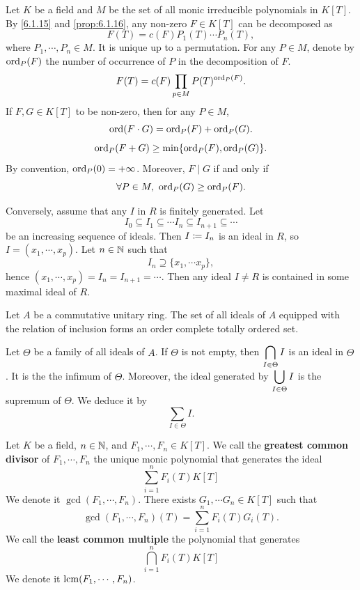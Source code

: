 \begin{remark}
    Let $K$ be a field and $M$ be the set of all monic irreducible polynomials in $K[T]$.
    By \ref{6.1.15} and \ref{prop:6.1.16},
    any non-zero $F \in K[T]$ can be decomposed as 
    $$F(T) = c(F) P_1(T) \cdots P_n(T),$$
    where $P_1,\cdots, P_n \in M$.
    It is unique up to a permutation.
    For any $P \in M$, denote by $\operatorname{\mathrm{ord}}_P(F)$ the number of occurrence of $P$ in the decomposition of $F$.
    $$F(T) = c(F) \prod_{p \in M} P(T)^{\operatorname{\mathrm{ord}}_P(F)}.$$
    If $F,G \in K[T]$ to be non-zero,
    then for any $P \in M$,
    $$\operatorname{\mathrm{ord}}(F \cdot G) = \operatorname{\mathrm{ord}}_P(F) + \operatorname{\mathrm{ord}}_P(G).$$
    $$\operatorname{\mathrm{ord}}_P(F + G) \ge \min\{\operatorname{\mathrm{ord}}_P(F), \operatorname{\mathrm{ord}}_P(G)\}.$$
    By convention, $\operatorname{\mathrm{ord}}_P(0) = +\infty$.
    Moreover, $F \mid G$ if and only if
    $$\forall P \in M,\ \operatorname{\mathrm{ord}}_P(G) \ge \operatorname{\mathrm{ord}}_P(F).$$
    
    \quad Conversely, assume that any $I$ in $R$ is finitely generated.
    Let
    $$I_0 \subseteq I_1 \subseteq \cdots I_n \subseteq I_{n+1} \subseteq \cdots$$
    be an increasing sequence of ideals.
    Then $\displaystyle I \coloneq I_n$ is an ideal in $R$, so $I = (x_1,\cdots,x_p)$.
    Let $n \in \mathbb{N}$ such that 
    $$I_n \supseteq \{x_1,\cdots x_p\},$$
    hence $(x_1,\cdots,x_p) = I_n = I_{n+1} = \cdots$.
    Then any ideal $I \neq R$ is contained in some maximal ideal of $R$.
\end{remark}

\begin{propositionenv}
    Let $A$ be a commutative unitary ring.
    The set of all ideals of $A$ equipped with the relation of inclusion forms an order complete totally ordered set.
\end{propositionenv}
\begin{proofenv}
    Let $\Theta$ be a family of all ideals of $A$.
    If $\Theta$ is not empty, then $\displaystyle \bigcap_{I \in \Theta} I$ is an ideal in $\Theta$.
    It is the the infimum of $\Theta$.
    Moreover, the ideal generated by $\displaystyle \bigcup_{I \in \Theta } I$ is the supremum of $\Theta$.
    We deduce it by
    $$\sum_{I \in \Theta} I.$$
\end{proofenv}

\begin{definitionenv}
    Let $K$ be a field, $n \in \mathbb{N}$, and $F_1,\cdots, F_n \in K[T]$.
    We call the \textbf{greatest common divisor} of $F_1,\cdots, F_n$ the unique monic polynomial that generates the ideal
    $$\sum_{i=1}^n F_i(T)K[T]$$
    We denote it $\gcd(F_1,\cdots, F_n)$.
    There exists $G_1,\cdots G_n \in K[T]$ such that
    $$\gcd(F_1,\cdots, F_n)(T) = \sum_{i=1}^n F_i(T)G_i(T).$$
    We call the \textbf{least common multiple} the polynomial that generates
    $$\bigcap_{i=1}^n F_i(T)K[T]$$
    We denote it $\operatorname{\mathrm{lcm}}(F_1,\cdots, F_n)$.
\end{definitionenv}

